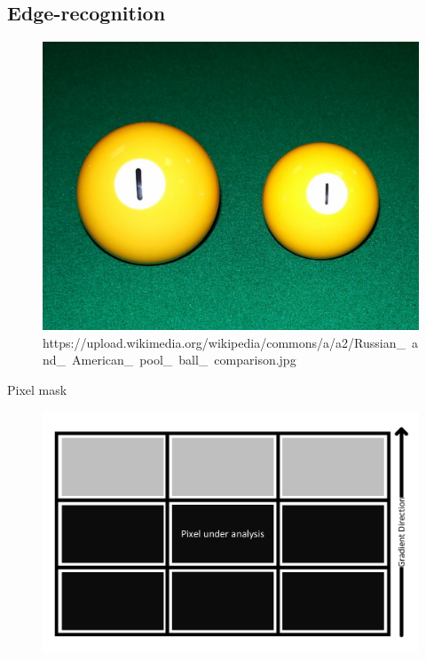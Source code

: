 \subsection{Edge-recognition}
\begin{frame}[fragile]{\insertsection}{\insertsubsection}
\begin{figure}[ht]\centering
\begin{minipage}{.95\textwidth}
\includegraphics[scale=0.2]{pictures/Simon/pool_ball.jpg}
\caption{https://upload.wikimedia.org/wikipedia/commons/a/a2/Russian\_\ and\_\ American\_\ pool\_\ ball\_\ comparison.jpg}
\end{minipage}
\end{figure}
\end{frame}

\begin{frame}[fragile]{\insertsection}{Pixel mask}
\begin{figure}[ht]
\includegraphics[scale=0.4]{pictures/Simon/presentation_mask}
\centering
\end{figure}
\end{frame}

